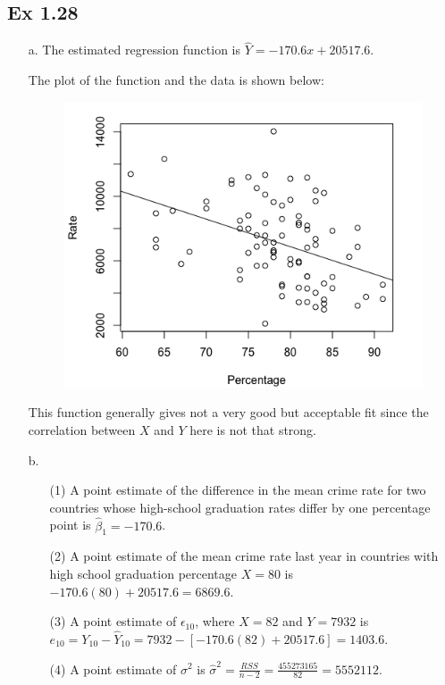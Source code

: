 \documentclass[10pt]{report}
\begin{document}
\subsection*{Ex 1.28}
\begin{enumerate}
	\item [a.]
	The estimated regression function is $\hat{Y} = -170.6x + 20517.6$.
	
	The plot of the function and the data is shown below:
	\begin{figure}[H]
		\centering
		\includegraphics[width=.6\linewidth]{28a.png}
	\end{figure}
	This function generally gives not a very good but acceptable fit since the correlation between $X$ and $Y$ here is not that strong.
	
	\item [b.]
	\begin{enumerate}
		\item [(1)]
		A point estimate of the difference in the mean crime rate for two countries whose high-school graduation rates differ by one percentage point is $\hat{\beta}_1 = -170.6$.
		
		\item [(2)]
		A point estimate of the mean crime rate last year in countries with high school graduation percentage $X=80$ is $-170.6(80) + 20517.6 = 6869.6$.
		
		\item [(3)]
		A point estimate of $\epsilon_{10}$, where $X=82$ and $Y=7932$ is $e_{10} = Y_{10} - \hat{Y}_{10} = 7932 - [-170.6(82) + 20517.6] = 1403.6$.
		
		\item [(4)]
		A point estimate of $\sigma^2$ is $\hat{\sigma}^2 = \frac{RSS}{n-2} = \frac{455273165}{82} = 5552112$.
		
	\end{enumerate}
\end{enumerate}
\end{document}
